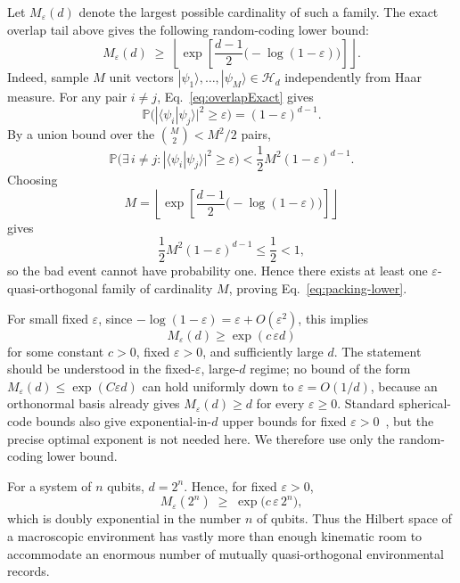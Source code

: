 \documentclass[aps,pra,reprint,superscriptaddress,nofootinbib,longbibliography]{revtex4-2}
\newcommand{\ket}[1]{| #1 \rangle}
\newcommand{\braket}[2]{\langle #1 | #2 \rangle}
\newcommand{\eps}{\varepsilon}
\newcommand{\HH}{\mathcal{H}}
\newcommand{\PP}{\mathbb{P}}
\begin{document}
Let $M_\eps(d)$ denote the largest possible cardinality of such a family.  The
exact overlap tail above gives the following random-coding lower bound:
\begin{equation}
    M_\eps(d)
    \;\ge\;
    \left\lfloor
    \exp\!\left[
        \frac{d-1}{2}\bigl(-\log(1-\eps)\bigr)
    \right]
    \right\rfloor .
    \label{eq:packing-lower}
\end{equation}
Indeed, sample $M$ unit vectors $\ket{\psi_1},\dots,\ket{\psi_M}\in\HH_d$
independently from Haar measure.  For any pair $i\ne j$, Eq.~\eqref{eq:overlapExact}
gives
\begin{equation}
\PP\bigl(|\braket{\psi_i}{\psi_j}|^2 \ge \eps\bigr)
= (1-\eps)^{d-1}.
\end{equation}
By a union bound over the $\binom{M}{2}<M^2/2$ pairs,
\begin{equation}
\PP\bigl(\exists\, i\ne j:
 |\braket{\psi_i}{\psi_j}|^2 \ge \eps\bigr)
<
\frac12 M^2(1-\eps)^{d-1}.
\end{equation}
Choosing
\begin{equation}
M=
\left\lfloor
\exp\!\left[
        \frac{d-1}{2}\bigl(-\log(1-\eps)\bigr)
    \right]
\right\rfloor
\end{equation}
gives
\begin{equation}
\frac12 M^2(1-\eps)^{d-1}\leq \frac12<1,
\end{equation}
so the bad event cannot have probability one. Hence there exists at least
one $\eps$-quasi-orthogonal family of cardinality $M$, proving
Eq.~\eqref{eq:packing-lower}.

For small fixed $\eps$, since $-\log(1-\eps)=\eps+O(\eps^2)$, this implies
\begin{equation}
    M_\eps(d)\ge \exp(c\,\eps d)
\end{equation}
for some constant $c>0$, fixed $\eps>0$, and sufficiently large $d$.  The
statement should be understood in the fixed-$\eps$, large-$d$ regime; no bound
of the form $M_\eps(d)\le \exp(C\eps d)$ can hold uniformly down to
$\eps=O(1/d)$, because an orthonormal basis already gives
$M_\eps(d)\ge d$ for every $\eps\ge0$.  Standard spherical-code bounds also
give exponential-in-$d$ upper bounds for fixed $\eps>0$~\cite{kabatiansky1978bounds,conway1999sphere}, but the precise optimal exponent is not needed here. We therefore use only the random-coding lower bound.

For a system of $n$ qubits, $d=2^n$. Hence, for fixed $\eps>0$,
\begin{equation}
    M_\eps(2^n)
    \;\ge\;
    \exp\!\bigl(c\,\eps\,2^n\bigr),
\end{equation}
which is doubly exponential in the number $n$ of qubits. Thus the Hilbert
space of a macroscopic environment has vastly more than enough kinematic room
to accommodate an enormous number of mutually quasi-orthogonal environmental
records.
\end{document}
